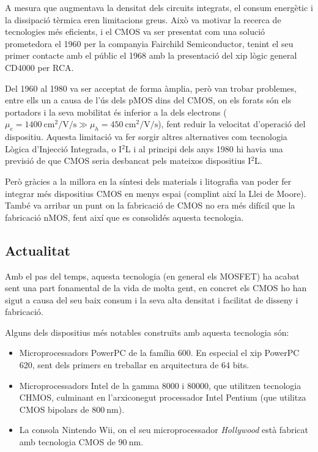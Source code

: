 \documentclass[11pt,a4paper]{article}
\begin{document}
A mesura que augmentava la densitat dels circuits integrats, el consum energètic i la dissipació tèrmica eren limitacions greus. Això va motivar la recerca de tecnologies més eficients, i el CMOS va ser presentat com una solució prometedora el 1960 per la companyia Fairchild Semiconductor, tenint el seu primer contacte amb el públic el 1968 amb la presentació del xip lògic general CD4000 per RCA\autocite{wiki:4000-series_integrated_circuits}.

Del 1960 al 1980 va ser acceptat de forma àmplia, però van trobar problemes, entre ells un a causa de l'ús dels pMOS dins del CMOS, on els forats són els portadors i la seva mobilitat és inferior a la dels electrons ($\mu_e = \qty{1400}{\centi\meter\squared\per\volt\per\second} \gg \mu_h = \qty{450}{\centi\meter\squared\per\volt\per\second}$), fent reduir la velocitat d'operació del dispositiu. Aquesta limitació va fer sorgir altres alternatives com tecnologia Lògica d'Injecció Integrada, o I$^2$L i al principi dels anys 1980 hi havia una previsió de que CMOS seria desbancat pels mateixos dispositius I$^2$L. 

Però gràcies a la millora en la síntesi dels materials i litografia van poder fer integrar més dispositius CMOS en menys espai (complint així la Llei de Moore). També va arribar un punt on la fabricació de CMOS no era més difícil que la fabricació nMOS, fent així que es consolidés aquesta tecnologia.

\subsection{Actualitat}

Amb el pas del temps, aquesta tecnologia (en general els MOSFET) ha acabat sent una part fonamental de la vida de molta gent, en concret els CMOS ho han sigut a causa del seu baix consum i la seva alta densitat i facilitat de disseny i fabricació. 

Alguns dels dispositius més notables construïts amb aquesta tecnologia són:
\begin{itemize}
    \item Microprocessadors PowerPC de la família 600. En especial el xip PowerPC 620, sent dels primers en treballar en arquitectura de 64 bits.
    \item Microprocessadors Intel de la gamma 8000 i 80000, que utilitzen tecnologia CHMOS, culminant en l'arxiconegut processador Intel Pentium (que utilitza CMOS bipolars de $\qty{800}{\nano\meter}$).
    \item La consola Nintendo Wii, on el seu microprocessador \textit{Hollywood} està fabricat amb tecnologia CMOS de $\qty{90}{\nano\meter}$.
\end{itemize}
\end{document}
